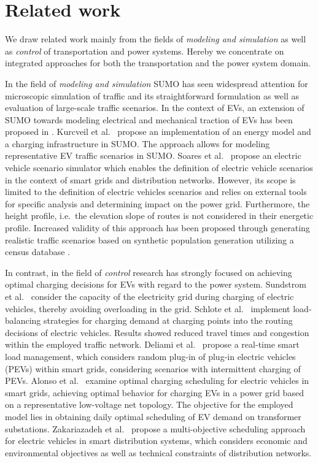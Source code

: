 \section{Related work}
\label{section:retrospection}

We draw related work mainly from the fields of \textit{modeling and simulation} as well as \textit{control} of transportation and power systems. Hereby we concentrate on integrated approaches for both the transportation and the power system domain.

In the field of \textit{modeling and simulation} SUMO \cite{behrisch2011sumo} has seen widespread attention for microscopic simulation of traffic and its straightforward formulation as well as evaluation of large-scale traffic scenarios. In the context of EVs, an extension of SUMO towards modeling electrical and mechanical traction of EVs has been proposed in \cite{maia2011electric}. Kurcveil et al.~\cite{kurczveil2014implementation} propose an implementation of an energy model and a charging infrastructure in SUMO. The approach allows for modeling representative EV traffic scenarios in SUMO. Soares et al.~\cite{soares2012electric} propose an electric vehicle scenario simulator which enables the definition of electric vehicle scenarios in the context of smart grids and distribution networks. However, its scope is limited to the definition of electric vehicles scenarios and relies on external tools for specific analysis and determining impact on the power grid. Furthermore, the height profile, i.e.\ the elevation slope of routes is not considered in their energetic profile. Increased validity of this approach has been proposed through generating realistic traffic scenarios based on synthetic population generation utilizing a census database \cite{soares2014realistic}.

In contrast, in the field of \textit{control} research has strongly focused on achieving optimal charging decisions for EVs with regard to the power system. Sundstrom et al.~\cite{sundstrom2010planning} consider the capacity of the electricity grid during charging of electric vehicles, thereby avoiding overloading in the grid. Schlote et al.~\cite{schlote2012balanced} implement load-balancing strategies for charging demand at charging points into the routing decisions of electric vehicles. Results showed reduced travel times and congestion within the employed traffic network. Deliami et al.~\cite{deilami2011real} propose a real-time smart load management, which considers random plug-in of plug-in electric vehicles (PEVs) within smart grids, considering scenarios with intermittent charging of PEVs. Alonso et al.~\cite{alonso2014optimal} examine optimal charging scheduling for electric vehicles in smart grids, achieving optimal behavior for charging EVs in a power grid based on a representative low-voltage net topology. The objective for the employed model lies in obtaining daily optimal scheduling of EV demand on transformer substations. Zakariazadeh et al.~\cite{zakariazadeh2014multi} propose a multi-objective scheduling approach for electric vehicles in smart distribution systems, which considers economic and environmental objectives as well as technical constraints of distribution networks.

